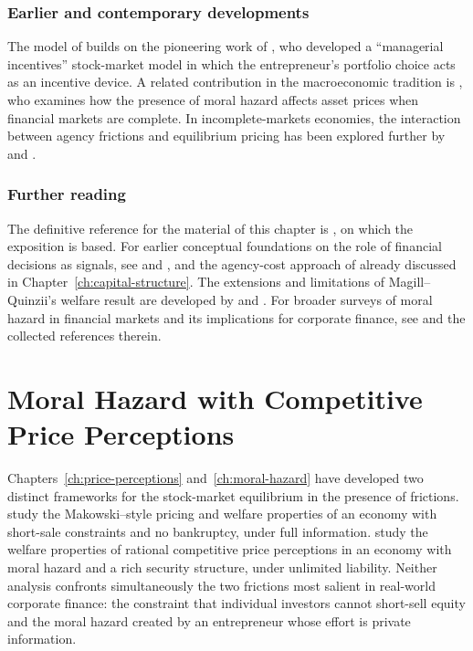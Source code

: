 \documentclass[11pt,a4paper,oneside]{book}
\theoremstyle{plain}
\theoremstyle{definition}
\theoremstyle{remark}
\numberwithin{equation}{chapter}
\begin{document}
\subsection{Earlier and contemporary developments}

The model of \citet{MagillQuinzii2002} builds on the pioneering work of \citet{KihlstromMatthews1990}, who developed a ``managerial incentives'' stock-market model in which the entrepreneur's portfolio choice acts as an incentive device.
A related contribution in the macroeconomic tradition is \citet{Kocherlakota1998}, who examines how the presence of moral hazard affects asset prices when financial markets are complete.
In incomplete-markets economies, the interaction between agency frictions and equilibrium pricing has been explored further by \citet{BisinGottardiRampini2008} and \citet{AcharyaBisin2009}.

\subsection{Further reading}

The definitive reference for the material of this chapter is \citet{MagillQuinzii2002}, on which the exposition is based.
For earlier conceptual foundations on the role of financial decisions as signals, see \citet{Ross1977} and \citet{LelandPyle1977}, and the agency-cost approach of \citet{JensenMeckling1976} already discussed in Chapter~\ref{ch:capital-structure}.
The extensions and limitations of Magill--Quinzii's welfare result are developed by \citet{CalcagnoWagner2006} and \citet{QuigginChambers2006}.
For broader surveys of moral hazard in financial markets and its implications for corporate finance, see \citet{Tirole2006} and the collected references therein.

\chapter{Moral Hazard with Competitive Price Perceptions}
\label{ch:moral-hazard-cpp}

Chapters~\ref{ch:price-perceptions} and~\ref{ch:moral-hazard} have developed two distinct frameworks for the stock-market equilibrium in the presence of frictions.
\citet{BisinGottardiRuta2015} study the Makowski--style pricing and welfare properties of an economy with short-sale constraints and no bankruptcy, under full information.
\citet{MagillQuinzii2002} study the welfare properties of rational competitive price perceptions in an economy with moral hazard and a rich security structure, under unlimited liability.
Neither analysis confronts simultaneously the two frictions most salient in real-world corporate finance: the constraint that individual investors cannot short-sell equity and the moral hazard created by an entrepreneur whose effort is private information.
\end{document}
